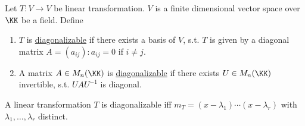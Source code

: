 \begin{definition}
	Let \( T: V \to V \) be linear transformation. \( V \) is a finite dimensional vector space over
	\( \KK \) be a field. Define
	\begin{enumerate}
		\item \( T \) is \underline{diagonalizable} if there exists a basis of \( V \), s.t. \( T \) is
		      given by a diagonal matrix \( A = (a_{ij}): a_{ij} = 0 \) if \( i \ne j \).
		\item A matrix \( A \in M_n(\KK) \) is \underline{diagonalizable} if there exists \( U \in
		      M_n(\KK) \) invertible, s.t. \( U A U^{-1} \) is diagonal.
	\end{enumerate}
\end{definition}

\begin{proposition}
	A linear transformation \( T \) is diagonalizable iff \( m_T = (x - \lambda_1) \cdots (x-\lambda_r) \)
	with \( \lambda_1,\ldots, \lambda_r \) distinct.
\end{proposition}


